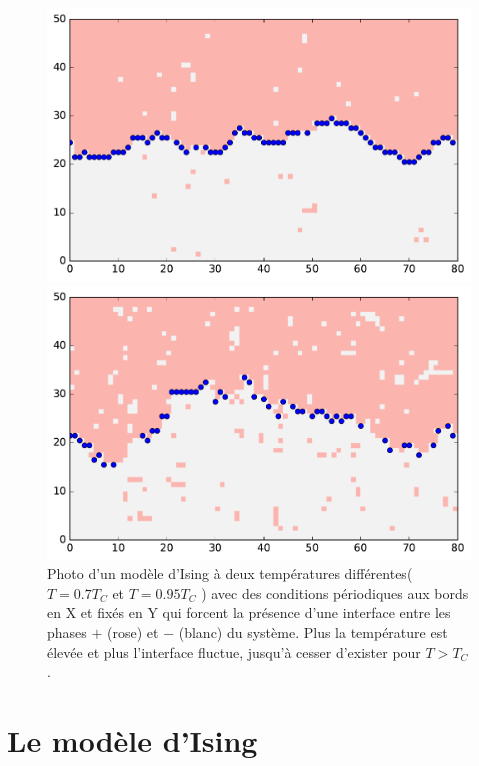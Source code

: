 \begin{figure}
	\begin{minipage}[t]{0.5\linewidth}
		\includegraphics[width=\linewidth]{isingtosos/snap07.pdf}
	\end{minipage}%
	\begin{minipage}[t]{0.5\linewidth}
		\includegraphics[width=\linewidth]{isingtosos/snap09.pdf}
	\end{minipage}
	\caption{Photo d'un modèle d'Ising à deux températures différentes($T=0.7 T_C$ et $T=0.95 T_C$ ) avec des conditions périodiques aux bords en X et fixés en Y qui forcent la présence d'une interface entre les phases $+$ (rose) et $-$ (blanc) du système. Plus la température est élevée et plus l'interface fluctue, jusqu'à cesser d'exister pour $T > T_C$. }
	\label{amas-fixe}
\end{figure}

  \section{Le modèle d'Ising}
  
